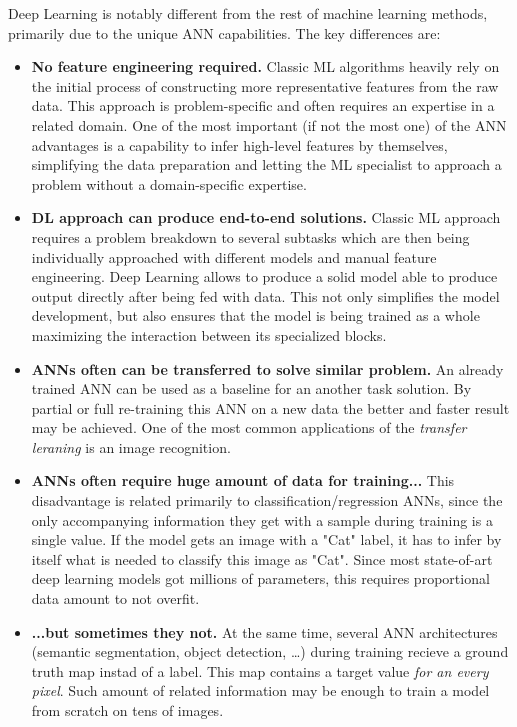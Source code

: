 \documentclass[thesis=B,english]{FITthesis}[2019/12/23]
\begin{document}
Deep Learning is notably different from the rest of machine learning methods, primarily due to the unique ANN capabilities. The key differences are:
\begin{itemize}
	\item \textbf{No feature engineering required.} Classic ML algorithms heavily rely on the initial process of constructing more representative features from the raw data. This approach is problem-specific and often requires an expertise in a related domain. One of the most important (if not the most one) of the ANN advantages is a capability to infer high-level features by themselves, simplifying the data preparation and letting the ML specialist to approach a problem without a domain-specific expertise.
	
	\item \textbf{DL approach can produce end-to-end solutions.} Classic ML approach requires a problem breakdown to several subtasks which are then being individually approached with different models and manual feature engineering. Deep Learning allows to produce a solid model able to produce output directly after being fed with data. This not only simplifies the model development, but also ensures that the model is being trained as a whole maximizing the interaction between its specialized blocks.
	
	\item \textbf{ANNs often can be transferred to solve similar problem.} An already trained ANN can be used as a baseline for an another task solution. By partial or full re-training this ANN on a new data the better and faster result may be achieved. One of the most common applications of the \textit{transfer leraning} is an image recognition.
	
	\item \textbf{ANNs often require huge amount of data for training...}
	This disadvantage is related primarily to classification/regression ANNs, since the only accompanying information they get with a sample during training is a single value. If the model gets an image with a "Cat" label, it has to infer by itself what is needed to classify this image as "Cat". Since most state-of-art deep learning models got millions of parameters, this requires proportional data amount to not overfit.
	
	\item \textbf{...but sometimes they not.} At the same time, several ANN architectures (semantic segmentation, object detection, \dots) during training recieve a ground truth map instad of a label. This map contains a target value \textit{for an every pixel}. Such amount of related information may be enough to train a model from scratch on tens of images.


\end{itemize}
\end{document}
